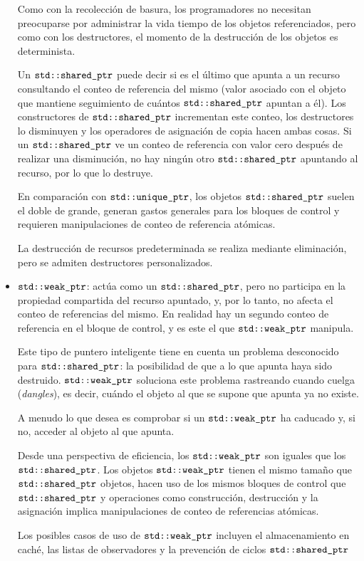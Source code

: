 \documentclass[10pt]{article}
\begin{document}
\begin{itemize}
	Como con la recolección de basura, los programadores no necesitan preocuparse por administrar la vida tiempo de los objetos referenciados, pero como con los destructores, el momento de la destrucción de los objetos es determinista.
	
	Un $ \verb*|std::shared_ptr| $ puede decir si es el último que apunta a un recurso consultando el conteo de referencia del mismo (valor asociado con el objeto que mantiene seguimiento de cuántos $ \verb*|std::shared_ptr| $ apuntan a él). Los constructores de $ \verb*|std::shared_ptr| $ incrementan este conteo, los destructores lo disminuyen y los operadores de asignación de copia hacen ambas cosas. Si un $ \verb*|std::shared_ptr| $ ve un conteo de referencia con valor cero después de realizar una disminución, no hay ning\'un otro $ \verb*|std::shared_ptr| $ apuntando al recurso, por lo que lo destruye.
	
	En comparación con $ \verb*|std::unique_ptr| $, los objetos $ \verb*|std::shared_ptr| $ suelen el doble de grande, generan gastos generales para los bloques de control y requieren manipulaciones de conteo de referencia at\'omicas.
	
	La destrucción de recursos predeterminada se realiza mediante eliminación, pero se admiten destructores personalizados.
	
	\item $ \verb*|std::weak_ptr| $: actúa como un $ \verb*|std::shared_ptr| $, pero no participa en la propiedad compartida del recurso apuntado, y, por lo tanto, no afecta el conteo de referencias del mismo. En realidad hay un segundo conteo de referencia en el bloque de control, y es este el que $ \verb*|std::weak_ptr| $ manipula.
	
	Este tipo de puntero inteligente tiene en cuenta un problema desconocido para $ \verb*|std::shared_ptr| $: la posibilidad de que a lo que apunta haya sido destruido. $ \verb*|std::weak_ptr| $ soluciona este problema rastreando cuando cuelga (\textit{dangles}), es decir, cu\'ando el objeto al que se supone que apunta ya no existe.
	
	A menudo lo que desea es comprobar si un $ \verb*|std::weak_ptr| $ ha caducado y, si no, acceder al objeto al que apunta. 
	
	Desde una perspectiva de eficiencia, los $ \verb*|std::weak_ptr| $ son iguales que los $ \verb*|std::shared_ptr| $. Los objetos $ \verb*|std::weak_ptr| $ tienen el mismo tamaño que $ \verb*|std::shared_ptr| $ objetos, hacen uso de los mismos bloques de control que $ \verb*|std::shared_ptr| $ y operaciones como construcción, destrucción y la asignación implica manipulaciones de conteo de referencias atómicas. 
	
	Los posibles casos de uso de $ \verb*|std::weak_ptr| $ incluyen el almacenamiento en caché, las listas de observadores y la prevención de ciclos $ \verb*|std::shared_ptr| $
\end{itemize} 
\end{document}
